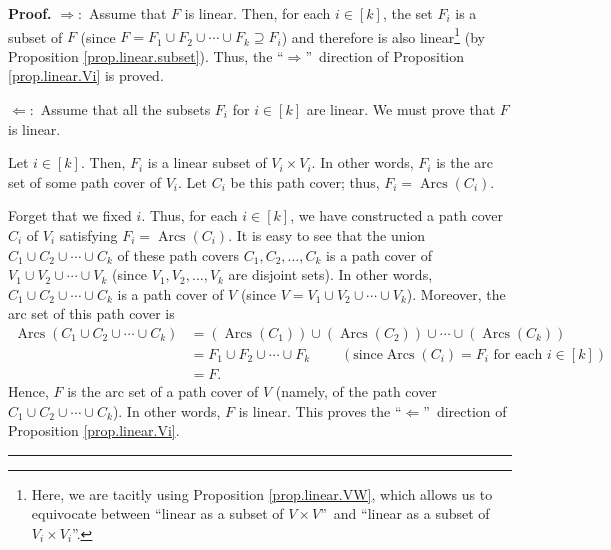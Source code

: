 \documentclass[numbers=enddot,12pt,final,onecolumn,notitlepage]{scrartcl}%
\numberwithin{exer}{section}
\theoremstyle{definition}
\newenvironment{proof}[1][Proof]{\noindent\textbf{#1.} }{\ \rule{0.5em}{0.5em}}
\newenvironment{verlong}{}{}
\begin{document}
\begin{verlong}
\begin{proof}
$\Longrightarrow:$ Assume that $F$ is linear. Then, for each $i\in\left[
k\right]  $, the set $F_{i}$ is a subset of $F$ (since $F=F_{1}\cup F_{2}%
\cup\cdots\cup F_{k}\supseteq F_{i}$) and therefore is also
linear\footnote{Here, we are tacitly using Proposition \ref{prop.linear.VW},
which allows us to equivocate between \textquotedblleft linear as a subset of
$V\times V$\textquotedblright\ and \textquotedblleft linear as a subset of
$V_{i}\times V_{i}$\textquotedblright.} (by Proposition
\ref{prop.linear.subset}). Thus, the \textquotedblleft$\Longrightarrow
$\textquotedblright\ direction of Proposition \ref{prop.linear.Vi} is proved.

$\Longleftarrow:$ Assume that all the subsets $F_{i}$ for $i\in\left[
k\right]  $ are linear. We must prove that $F$ is linear.

Let $i\in\left[  k\right]  $. Then, $F_{i}$ is a linear subset of $V_{i}\times
V_{i}$. In other words, $F_{i}$ is the arc set of some path cover of $V_{i}$.
Let $C_{i}$ be this path cover; thus, $F_{i}=\operatorname*{Arcs}\left(
C_{i}\right)  $.

Forget that we fixed $i$. Thus, for each $i\in\left[  k\right]  $, we have
constructed a path cover $C_{i}$ of $V_{i}$ satisfying $F_{i}%
=\operatorname*{Arcs}\left(  C_{i}\right)  $. It is easy to see that the union
$C_{1}\cup C_{2}\cup\cdots\cup C_{k}$ of these path covers $C_{1},C_{2}%
,\ldots,C_{k}$ is a path cover of $V_{1}\cup V_{2}\cup\cdots\cup V_{k}$ (since
$V_{1},V_{2},\ldots,V_{k}$ are disjoint sets). In other words, $C_{1}\cup
C_{2}\cup\cdots\cup C_{k}$ is a path cover of $V$ (since $V=V_{1}\cup
V_{2}\cup\cdots\cup V_{k}$). Moreover, the arc set of this path cover is%
\begin{align*}
\operatorname*{Arcs}\left(  C_{1}\cup C_{2}\cup\cdots\cup C_{k}\right)   &
=\left(  \operatorname*{Arcs}\left(  C_{1}\right)  \right)  \cup\left(
\operatorname*{Arcs}\left(  C_{2}\right)  \right)  \cup\cdots\cup\left(
\operatorname*{Arcs}\left(  C_{k}\right)  \right) \\
&  =F_{1}\cup F_{2}\cup\cdots\cup F_{k}\ \ \ \ \ \ \ \ \ \ \left(  \text{since
}\operatorname*{Arcs}\left(  C_{i}\right)  =F_{i}\text{ for each }i\in\left[
k\right]  \right) \\
&  =F.
\end{align*}
Hence, $F$ is the arc set of a path cover of $V$ (namely, of the path cover
$C_{1}\cup C_{2}\cup\cdots\cup C_{k}$). In other words, $F$ is linear. This
proves the \textquotedblleft$\Longleftarrow$\textquotedblright\ direction of
Proposition \ref{prop.linear.Vi}.
\end{proof}
\end{verlong}
\end{document}
